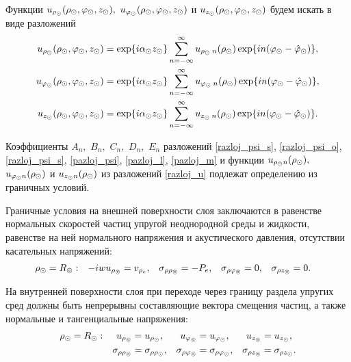\newpage
Функции $u_{\rho_\odot}(\rho_\odot, \varphi_\odot, z_\odot),$ $u_{\varphi_\odot}(\rho_\odot, \varphi_\odot, z_\odot)$ и $u_{z_\odot}(\rho_\odot, \varphi_\odot, z_\odot)$ будем искать в виде разложений
\begin{equation}\label{razloj_u}
\begin{aligned}
u_{\rho_\odot}(\rho_\odot, \varphi_\odot, z_\odot)&=\exp\{i\alpha_\odot z_\odot\}\sum_{n=-\infty}^{\infty}u_{\rho_\odot\:n}(\rho_\odot)\exp\{in(\varphi_\odot-\hat{\varphi}_\odot)\},\\
u_{\varphi_\odot}(\rho_\odot, \varphi_\odot, z_\odot)&=\exp\{i\alpha_\odot z_\odot\}\sum_{n=-\infty}^{\infty}u_{\varphi_\odot\:n}(\rho_\odot)\exp\{in(\varphi_\odot-\hat{\varphi}_\odot)\},\\
u_{z_\odot}(\rho_\odot, \varphi_\odot, z_\odot)&=\exp\{i\alpha_\odot z_\odot\}\sum_{n=-\infty}^{\infty}u_{z_\odot\:n}(\rho_\odot)\exp\{in(\varphi_\odot-\hat{\varphi}_\odot)\}.
\end{aligned}
\end{equation}

Коэффициенты $A_n,$ $B_n,$ $C_n,$ $D_n,$ $E_n$ разложений \eqref{razloj_psi_s}, \eqref{razloj_psi_o}, \eqref{razloj_psi_s}, \eqref{pazloj_psi}, \eqref{pazloj_l}, \eqref{pazloj_m} и функции $u_{\rho_\odot n}(\rho_\odot),$ $u_{\varphi_\odot n}(\rho_\odot)$ и $u_{z_\odot n}(\rho_\odot)$ из разложений \eqref{razloj_u} подлежат определению из граничных условий.

Граничные условия на внешней поверхности слоя заключаются в равенстве нормальных скоростей частиц упругой неоднородной среды и жидкости, равенстве на ней нормального напряжения и акустического давления, отсутствии касательных напряжений:
\begin{equation}\label{vneshnaja_pover_sloja}
\begin{aligned}
\rho_\odot &=R_\circledcirc: &-iwu_{\rho_\circledcirc}&=v_{\rho_e}, &\sigma_{\rho\rho_\circledcirc}&=-P_e, &\sigma_{\rho\varphi_\circledcirc}&=0, &\sigma_{\rho z_\circledcirc}&=0.
\end{aligned}
\end{equation}

На внутренней поверхности слоя при переходе через границу раздела упругих сред должны быть непрерывны составляющие вектора смещения частиц, а также нормальные и тангенциальные напряжения:
\begin{equation}\label{vnutr_pover_sloja}
\begin{aligned}
\rho_\odot&=R_\odot: &u_{\rho_\circledcirc}&=u_{\rho_\odot}, &u_{\varphi_\circledcirc}&=u_{\varphi_\odot}, &u_{z_\circledcirc}&=u_{z_\odot},\\
& &\sigma_{\rho\rho_\circledcirc}&=\sigma_{\rho\rho_\odot}, &\sigma_{\rho\varphi_\circledcirc}&=\sigma_{\rho\varphi_\odot},  &\sigma_{\rho z_\circledcirc}&=\sigma_{\rho z_\odot}.
\end{aligned}
\end{equation}

